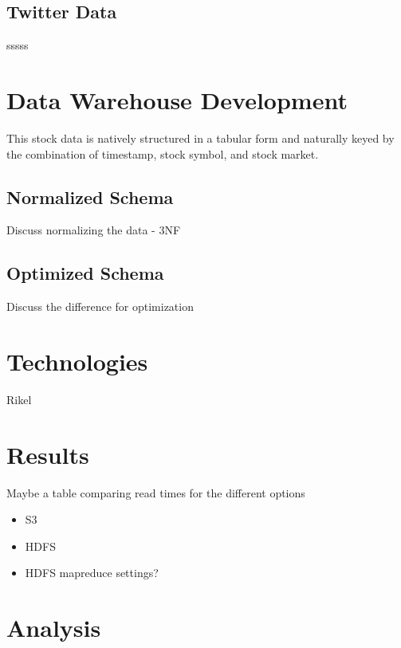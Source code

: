 \documentclass[journal]{IEEEtran}
\begin{document}
\subsection{Twitter Data}

sssss

\section{Data Warehouse Development}

This stock data is natively structured in a tabular form and naturally keyed by the combination of timestamp, stock symbol, and stock market.

\subsection{Normalized Schema}


Discuss normalizing the data - 3NF

\subsection{Optimized Schema}

Discuss the difference for optimization

\section{Technologies}

Rikel

\section{Results}



Maybe a table comparing read times for the different options

\begin{itemize}
	\item S3
	\item HDFS
	\item HDFS mapreduce settings?
\end{itemize}

\section{Analysis}
\end{document}
